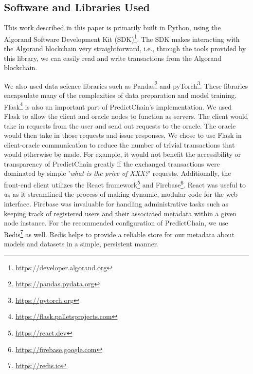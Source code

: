 \documentclass{ledger}
\begin{document}
\subsection{Software and Libraries Used}

%
%
This work described in this paper is primarily built in Python, using the Algorand Software Development Kit (SDK)\footnote{\url{https://developer.algorand.org}}. The SDK makes interacting with the Algorand blockchain very straightforward, i.e., through the tools provided by this library, we can easily read and write transactions from the Algorand blockchain.

We also used data science libraries such as Pandas\footnote{\url{https://pandas.pydata.org}} and pyTorch\footnote{\url{https://pytorch.org}}. These libraries encapsulate many of the complexities of data preparation and model training.
%
Flask\footnote{\url{https://flask.palletsprojects.com}} is also an important part of PredictChain's implementation. We used Flask to allow the client and oracle nodes to function as servers. The client would take in requests from the user and send out requests to the oracle. The oracle would then take in those requests and issue responses. We chose to use Flask in client-oracle communication to reduce the number of trivial transactions that would otherwise be made. For example, it would not benefit the accessibility or transparency of PredictChain greatly if the exchanged transactions were dominated by simple '\textit{what is the price of XXX?}' requests.
%
%
Additionally, the front-end client utilizes the React framework\footnote{\url{https://react.dev}} and Firebase\footnote{\url{https://firebase.google.com}}. React was useful to us as it streamlined the process of making dynamic, modular code for the web interface. Firebase was invaluable for handling administrative tasks such as keeping track of registered users and their associated metadata within a given node instance.
%
%
For the recommended configuration of PredictChain, we use Redis\footnote{\url{https://redis.io}} as well. Redis helps to provide a reliable store for our metadata about models and datasets in a simple, persistent manner.
\end{document}
